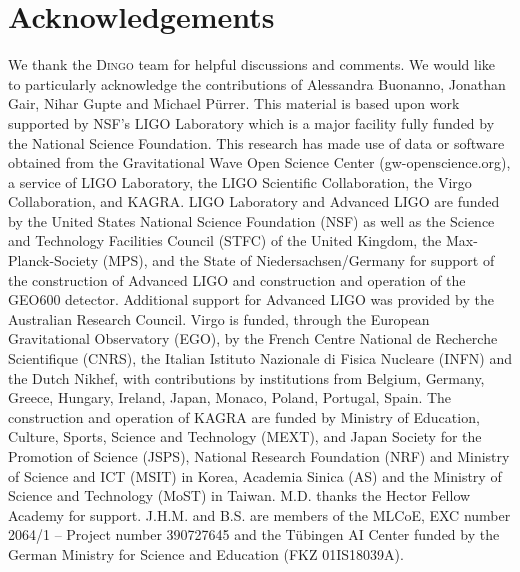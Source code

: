 \documentclass{article}
\theoremstyle{remark}
\begin{document}
\section*{Acknowledgements}
We thank the \textsc{Dingo} team for helpful discussions and comments. We would like to particularly acknowledge the contributions of Alessandra Buonanno, Jonathan Gair,  Nihar Gupte and Michael Pürrer. This material is based upon work supported by
NSF's LIGO Laboratory which is a major facility fully funded by the
National Science Foundation. This research has made use of data or
software obtained from the Gravitational Wave Open Science Center
(gw-openscience.org), a service of LIGO Laboratory, the LIGO
Scientific Collaboration, the Virgo Collaboration, and KAGRA. LIGO
Laboratory and Advanced LIGO are funded by the United States National
Science Foundation (NSF) as well as the Science and Technology
Facilities Council (STFC) of the United Kingdom, the
Max-Planck-Society (MPS), and the State of Niedersachsen/Germany for
support of the construction of Advanced LIGO and construction and
operation of the GEO600 detector. Additional support for Advanced LIGO
was provided by the Australian Research Council. Virgo is funded,
through the European Gravitational Observatory (EGO), by the French
Centre National de Recherche Scientifique (CNRS), the Italian Istituto
Nazionale di Fisica Nucleare (INFN) and the Dutch Nikhef, with
contributions by institutions from Belgium, Germany, Greece, Hungary,
Ireland, Japan, Monaco, Poland, Portugal, Spain. The construction and
operation of KAGRA are funded by Ministry of Education, Culture,
Sports, Science and Technology (MEXT), and Japan Society for the
Promotion of Science (JSPS), National Research Foundation (NRF) and
Ministry of Science and ICT (MSIT) in Korea, Academia Sinica (AS) and
the Ministry of Science and Technology (MoST) in Taiwan. 
M.D. thanks the Hector Fellow Academy for support. J.H.M. and B.S. are members of the MLCoE, EXC number 2064/1 – Project number 390727645 and the Tübingen AI Center funded by the German Ministry for Science and Education (FKZ 01IS18039A).







\newpage
\appendix
\end{document}
